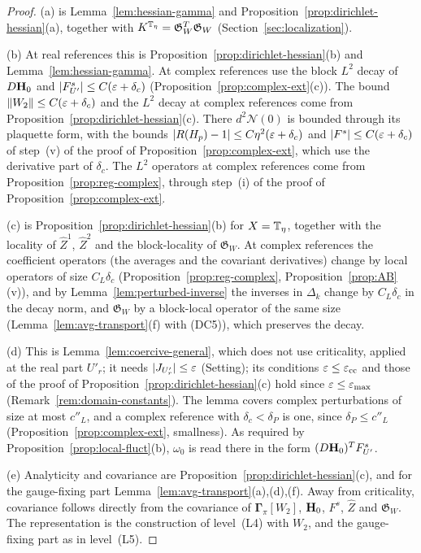 \begin{proof}
(a) is Lemma~\ref{lem:hessian-gamma} and Proposition~\ref{prop:dirichlet-hessian}(a), together with $K^{\mathbb T_\eta}=\mathfrak G_W^T\mathfrak G_W$ (Section~\ref{sec:localization}).

(b) At real references this is Proposition~\ref{prop:dirichlet-hessian}(b) and Lemma~\ref{lem:hessian-gamma}. At complex references use the block $L^2$ decay of $D\mathbf H_0$ and $|F^s_{U'}|\le C(\varepsilon+\delta_c)$ (Proposition~\ref{prop:complex-ext}(c)). The bound $\|W_2\|\le C(\varepsilon+\delta_c)$ and the $L^2$ decay at complex references come from Proposition~\ref{prop:dirichlet-hessian}(c). There $d^2\mathcal N(0)$ is bounded through its plaquette form, with the bounds $|R(H_p)-1|\le C\eta^2(\varepsilon+\delta_c)$ and $|F^s|\le C(\varepsilon+\delta_c)$ of step~(v) of the proof of Proposition~\ref{prop:complex-ext}, which use the derivative part of $\delta_c$. The $L^2$ operators at complex references come from Proposition~\ref{prop:reg-complex}, through step~(i) of the proof of Proposition~\ref{prop:complex-ext}.

(c) is Proposition~\ref{prop:dirichlet-hessian}(b) for $X=\mathbb T_\eta$, together with the locality of $\hat Z^1$, $\hat Z^2$ and the block-locality of $\mathfrak G_W$. At complex references the coefficient operators (the averages and the covariant derivatives) change by local operators of size $C_L\delta_c$ (Proposition~\ref{prop:reg-complex}, Proposition~\ref{prop:AB}(v)), and by Lemma~\ref{lem:perturbed-inverse} the inverses in $\Delta_k$ change by $C_L\delta_c$ in the decay norm, and $\mathfrak G_W$ by a block-local operator of the same size (Lemma~\ref{lem:avg-transport}(f) with (DC5)), which preserves the decay.

(d) This is Lemma~\ref{lem:coercive-general}, which does not use criticality, applied at the real part $U'_r$; it needs $|J_{U'_r}|\le\varepsilon$ (Setting); its conditions $\varepsilon\le\varepsilon_{\rm cc}$ and those of the proof of Proposition~\ref{prop:dirichlet-hessian}(c) hold since $\varepsilon\le\varepsilon_{\max}$ (Remark~\ref{rem:domain-constants}). The lemma covers complex perturbations of size at most $c''_L$, and a complex reference with $\delta_c<\delta_P$ is one, since $\delta_P\le c''_L$ (Proposition~\ref{prop:complex-ext}, smallness). As required by Proposition~\ref{prop:local-fluct}(b), $\omega_0$ is read there in the form $(D\mathbf H_0)^TF^s_{U'}$.

(e) Analyticity and covariance are Proposition~\ref{prop:dirichlet-hessian}(c), and for the gauge-fixing part Lemma~\ref{lem:avg-transport}(a),(d),(f). Away from criticality, covariance follows directly from the covariance of $\boldsymbol\Gamma_\pi[W_2]$, $\mathbf H_0$, $F^s$, $\hat Z$ and $\mathfrak G_W$. The representation is the construction of level~(L4) with $W_2$, and the gauge-fixing part as in level~(L5).
\end{proof}


